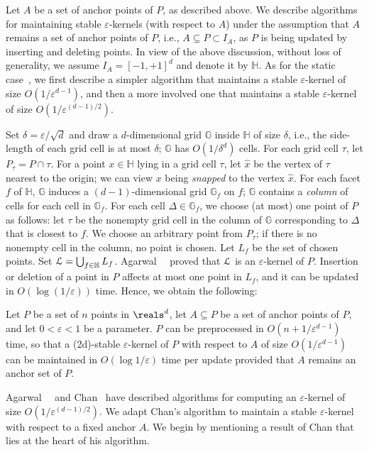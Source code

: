 \documentclass[11pt]{myclass}
\newcommand{\eps}{\varepsilon}
\def\grid{\mathbb{G}}
\def\hcube{\mathbb{H}}
\def\wkernel{\EuScript{L}}
\begin{document}
Let $A$ be a set of anchor points of $P$, as described above. We
describe algorithms for maintaining stable $\eps$-kernels (with respect
to $A$) under the assumption that $A$ remains a set of  anchor points of
$P$, i.e., $A \subseteq P \subset I_A$, as $P$ is being 
updated by inserting
and deleting points. In view of the above discussion, without loss of generality,
we assume $I_A = [-1,+1]^d$ and denote it by $\hcube$. As for the static
case~\cite{AHV04,Cha06}, we first describe a simpler algorithm that
maintains a stable $\eps$-kernel of size $O(1/\eps^{d-1})$, and then a 
more involved one that maintains a stable $\eps$-kernel of size 
$O(1/\eps^{(d-1)/2})$. 

Set $\delta=\eps/\sqrt{d}$ and draw a $d$-dimensional grid $\grid$ inside
$\hcube$ of size $\delta$, i.e., the side-length of each grid cell is
at most $\delta$; $\grid$ has $O(1/\delta^d)$ cells. For each grid
cell $\tau$, let $P_\tau = P \cap \tau$. For a point $x \in \hcube$ lying 
in a grid cell $\tau$, 
let $\hat{x}$ be the vertex of $\tau$ nearest to the origin; we can
view $x$ being \emph{snapped} to the vertex $\hat{x}$.
For each facet $f$ of $\hcube$,
$\grid$ induces a $(d-1)$-dimensional grid $\grid_f$ on $f$; $\grid$ contains
a \emph{column} of cells for each cell in $\grid_f$. For 
each cell $\Delta \in \grid_f$, we choose (at most) one point of $P$ 
as follows:
let $\tau$ be the nonempty grid cell in the column of $\grid$ 
corresponding to $\Delta$ that is closest to $f$. We choose an 
arbitrary point from $P_\tau$;
if there is no nonempty cell in the column, no point is chosen. Let
$L_f$ be the set of chosen points. Set $\wkernel = 
\bigcup_{f \in\hcube} L_f$. Agarwal~\etal~\cite{AHV04} proved that 
$\wkernel$ is an $\eps$-kernel of $P$.  Insertion or deletion of a point
in $P$ affects at most one point in $L_f$, and it can be updated in 
$O(\log (1/\eps))$ time. Hence, we obtain the following:

\begin{lemma}
Let $P$ be a set of $n$ points in $\reals^d$, let 
$A \subseteq P$ be a set of anchor points of $P$, and let $0 < \eps < 1$
be a parameter.  $P$ can be preprocessed in $O(n + 1/\eps^{d-1})$ time,
so that a (2d)-stable $\eps$-kernel of $P$ with respect to $A$ of 
size $O(1/\eps^{d-1})$ can be maintained in $O(\log 1/\eps)$ time 
per update provided that $A$ remains an anchor set of $P$.
\label{lem:weak-fixed}
\end{lemma}


Agarwal~\etal~\cite{AHV04} and Chan~\cite{Cha06} have described algorithms for 
computing an $\eps$-kernel of size $O(1/\eps^{(d-1)/2})$. We adapt Chan's 
algorithm to maintain a stable $\eps$-kernel with respect to a 
fixed anchor $A$. We begin by mentioning a result of Chan that lies 
at the heart of his algorithm.
\end{document}
